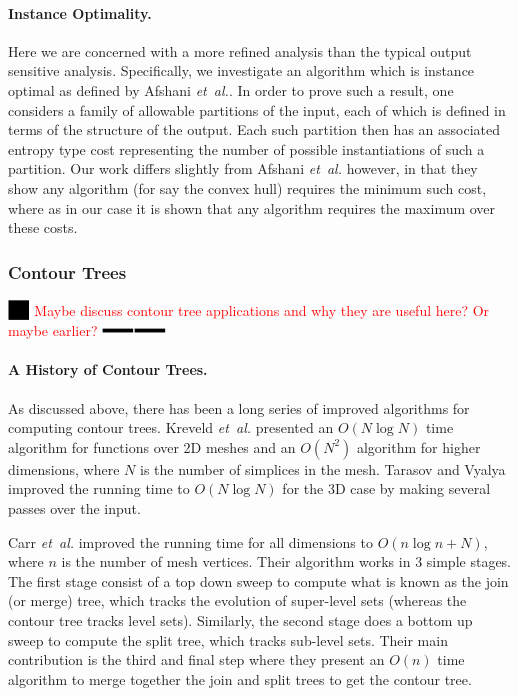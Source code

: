 \documentclass[11pt]{article}
\theoremstyle{definition}
\newcommand{\etal}{\textit{et~al.}\xspace}
\newcommand{\XSays}[2]{{
      {$\rule[-0.12cm]{0.2in}{0.5cm}$\fbox{\tt
            #1:} }
      \textcolor{red}{#2}
      \marginpar{\textcolor{blue}{#1}}
      {$\rule[0.1cm]{0.3in}{0.1cm}$\fbox{\tt
            end}$\rule[0.1cm]{0.3in}{0.1cm}$}
      }
   }
\newcommand{\Ben}[1]{{\XSays{Ben}{#1}}}
\begin{document}
\paragraph{Instance Optimality.}  
Here we are concerned with a more refined analysis than the typical output sensitive analysis.
Specifically, we investigate an algorithm which is instance optimal as defined by Afshani \etal \cite{abc-ioga-09}.  
In order to prove such a result, one considers a family of allowable partitions of the input, 
each of which is defined in terms of the structure of the output.  Each such partition then has 
an associated entropy type cost representing the number of possible instantiations of such a partition.
Our work differs slightly from Afshani \etal \cite{abc-ioga-09} however, in that they show any algorithm 
(for say the convex hull) requires the minimum such cost, where as in our case it is shown that 
any algorithm requires the maximum over these costs.


\subsubsection{Contour Trees}

\Ben{Maybe discuss contour tree applications and why they are useful here? Or maybe earlier?}

\paragraph{A History of Contour Trees.}
As discussed above, there has been a long series of improved algorithms for computing contour trees.
Kreveld \etal \cite{kobps-ctsssit-97} presented an $O(N\log N)$ time algorithm for functions over 2D 
meshes and an $O(N^2)$ algorithm for higher dimensions, where $N$ is the number of simplices in the mesh. 
Tarasov and Vyalya \cite{tv-cct-98} improved the running time to $O(N\log N)$ for the 3D case by making 
several passes over the input.

Carr \etal \cite{csa-cctad-00} improved the running time for all dimensions to $O(n\log n + N)$, 
where $n$ is the number of mesh vertices.  Their algorithm works in 3 simple stages.  
The first stage consist of a top down sweep to compute what is known as the join (or merge) tree, 
which tracks the evolution of super-level sets (whereas the contour tree tracks level sets).  
Similarly, the second stage does a bottom up sweep to compute the split tree, which tracks sub-level sets.  
Their main contribution is the third and final step where they present an $O(n)$ time algorithm to merge 
together the join and split trees to get the contour tree.  
\end{document}
